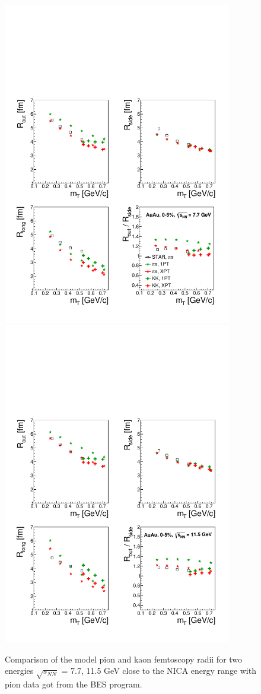 \documentclass[a4paper]{panl}
\begin{document}
\begin{figure}[t]
  \begin{center}
     \includegraphics[width=100mm]{fig5a.pdf}
     \includegraphics[width=100mm]{fig5b.pdf}
\vspace{-3mm}
\caption{Comparison of the model pion and kaon femtoscopy radii for two energies $\sqrt{s_{NN}}$ = 7.7, 11.5 GeV close to the NICA energy range
  with pion data got from the BES program.}
\end{center}
\vspace{-5mm}
\end{figure}
\end{document}
